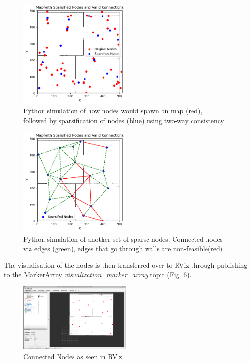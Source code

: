 \documentclass[conference]{IEEEtran}
\begin{document}
\begin{figure}[h]
  \centering
  \includegraphics[width=0.5\textwidth]{../assets/map_nodes_1.png}
  \caption{Python simulation of how nodes would spawn on map (red), followed by sparsification of nodes (blue) using two-way consistency}
  \label{fig:example}
\end{figure}
\begin{figure}[h]
  \centering
  \includegraphics[width=0.5\textwidth]{../assets/map_nodes_2.png}
  \caption{Python simulation of another set of sparse nodes. Connected nodes via edges (green), edges that go through walls are non-feasible(red)}
  \label{fig:example}
\end{figure}

The visualisation of the nodes is then transferred over to RViz through publishing to the MarkerArray \textit{visualization\_marker\_array} topic (Fig. 6).
\begin{figure}[h]
  \centering
  \includegraphics[width=0.5\textwidth]{../assets/map_nodes_3.png}
  \caption{Connected Nodes as seen in RViz.}
  \label{fig:example}
\end{figure}
\end{document}
